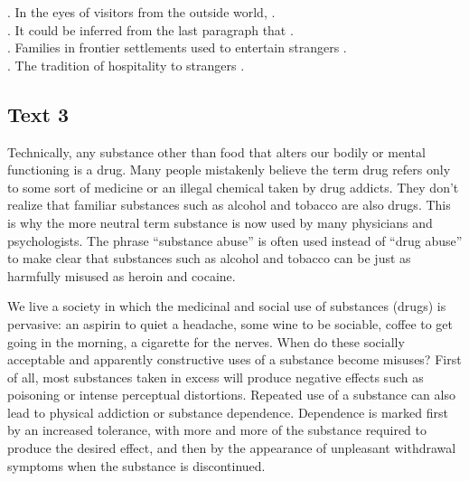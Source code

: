 \begin{questions}  .	In the eyes of visitors from the outside world, \ltk{}.\\
.	It could be inferred from the last paragraph that \ltk{}.\\
.	Families in frontier settlements used to entertain strangers \ltk{}.\\
.	The tradition of hospitality to strangers \ltk{}.\\

\end{questions}    \subsection{Text 3}
Technically, any substance other than food that alters our bodily or mental functioning is a drug. Many people mistakenly believe the term drug refers only to some sort of medicine or an illegal chemical taken by drug addicts. They don’t realize that familiar substances such as alcohol and tobacco are also drugs. This is why the more neutral term substance is now used by many physicians and psychologists. The phrase “substance abuse” is often used instead of “drug abuse” to make clear that substances such as alcohol and tobacco can be just as harmfully misused as heroin and cocaine.

We live a society in which the medicinal and social use of substances (drugs) is pervasive: an aspirin to quiet a headache, some wine to be sociable, coffee to get going in the morning, a cigarette for the nerves. When do these socially acceptable and apparently constructive uses of a substance become misuses? First of all, most substances taken in excess will produce negative effects such as poisoning or intense perceptual distortions. Repeated use of a substance can also lead to physical addiction or substance dependence. Dependence is marked first by an increased tolerance, with more and more of the substance required to produce the desired effect, and then by the appearance of unpleasant withdrawal symptoms when the substance is discontinued.

